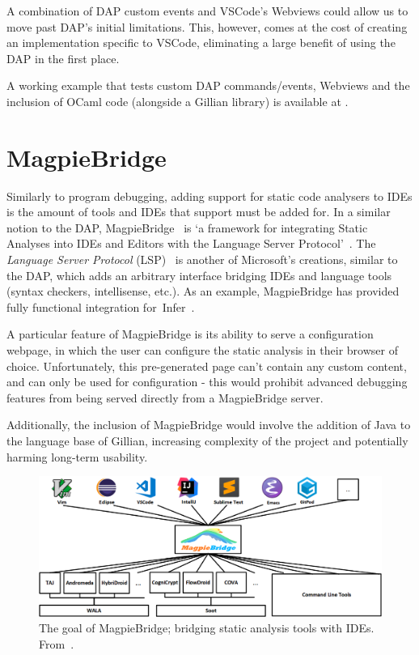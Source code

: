 \label{sec:background:extending-dap}
A combination of DAP custom events and VSCode's Webviews could allow us to move
past DAP's initial limitations. This, however, comes at the cost of creating an
implementation specific to VSCode, eliminating a large benefit of using the DAP
in the first place.

A working example that tests custom DAP commands/events, Webviews and the
inclusion of OCaml code (alongside a Gillian library) is available at
\cite{debugger-experiment}.

\section{MagpieBridge}

Similarly to program debugging, adding support for static code analysers to IDEs
is the amount of tools and IDEs that support must be added for. In a similar
notion to the DAP, MagpieBridge~\cite{magpiebridge} is `a framework for
integrating Static Analyses into IDEs and Editors with the Language Server
Protocol'~\cite{magpiebridge-repo}. The \textit{Language Server Protocol}
(LSP)~\cite{lsp} is another of Microsoft's creations, similar to the DAP, which
adds an arbitrary interface bridging IDEs and language tools (syntax checkers,
intellisense, etc.). As an example, MagpieBridge has provided fully
functional integration for~Infer~\cite{infer-ide}.

A particular feature of MagpieBridge is its ability to serve a configuration
webpage, in which the user can configure the static analysis in their browser
of choice. Unfortunately, this pre-generated page can't contain any custom
content, and can only be used for configuration - this would prohibit advanced
debugging features from being served directly from a MagpieBridge server.

Additionally, the inclusion of MagpieBridge would involve the addition of Java
to the language base of Gillian, increasing complexity of the project and
potentially harming long-term usability.


\begin{figure}
  \centering
  \includegraphics[width=\textwidth]{img/magpiebridge-goal.png}
  \caption{
    The goal of MagpieBridge; bridging static analysis tools with IDEs.
    From~\cite{magpiebridge-repo}.
  }
  \label{fig:magpiebridge-goal}
\end{figure}
